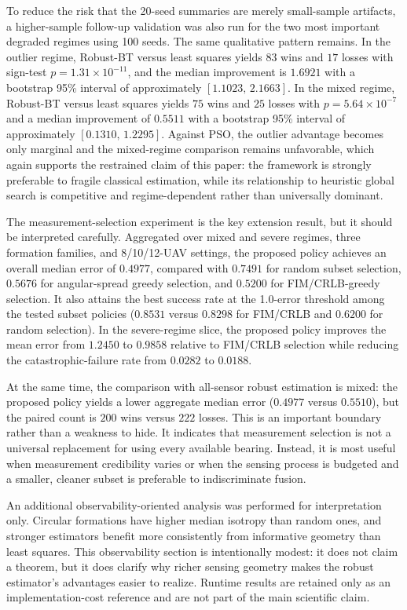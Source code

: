 \documentclass[preprint,12pt]{elsarticle}
\begin{document}
To reduce the risk that the 20-seed summaries are merely small-sample artifacts, a higher-sample follow-up validation was also run for the two most important degraded regimes using 100 seeds. The same qualitative pattern remains. In the outlier regime, Robust-BT versus least squares yields $83$ wins and $17$ losses with sign-test $p=1.31\times10^{-11}$, and the median improvement is $1.6921$ with a bootstrap 95\% interval of approximately $[1.1023,\,2.1663]$. In the mixed regime, Robust-BT versus least squares yields $75$ wins and $25$ losses with $p=5.64\times10^{-7}$ and a median improvement of $0.5511$ with a bootstrap 95\% interval of approximately $[0.1310,\,1.2295]$. Against PSO, the outlier advantage becomes only marginal and the mixed-regime comparison remains unfavorable, which again supports the restrained claim of this paper: the framework is strongly preferable to fragile classical estimation, while its relationship to heuristic global search is competitive and regime-dependent rather than universally dominant.

The measurement-selection experiment is the key extension result, but it should be interpreted carefully. Aggregated over mixed and severe regimes, three formation families, and 8/10/12-UAV settings, the proposed policy achieves an overall median error of $0.4977$, compared with $0.7491$ for random subset selection, $0.5676$ for angular-spread greedy selection, and $0.5200$ for FIM/CRLB-greedy selection. It also attains the best success rate at the 1.0-error threshold among the tested subset policies ($0.8531$ versus $0.8298$ for FIM/CRLB and $0.6200$ for random selection). In the severe-regime slice, the proposed policy improves the mean error from $1.2450$ to $0.9858$ relative to FIM/CRLB selection while reducing the catastrophic-failure rate from $0.0282$ to $0.0188$.

At the same time, the comparison with all-sensor robust estimation is mixed: the proposed policy yields a lower aggregate median error ($0.4977$ versus $0.5510$), but the paired count is $200$ wins versus $222$ losses. This is an important boundary rather than a weakness to hide. It indicates that measurement selection is not a universal replacement for using every available bearing. Instead, it is most useful when measurement credibility varies or when the sensing process is budgeted and a smaller, cleaner subset is preferable to indiscriminate fusion.

An additional observability-oriented analysis was performed for interpretation only. Circular formations have higher median isotropy than random ones, and stronger estimators benefit more consistently from informative geometry than least squares. This observability section is intentionally modest: it does not claim a theorem, but it does clarify why richer sensing geometry makes the robust estimator's advantages easier to realize. Runtime results are retained only as an implementation-cost reference and are not part of the main scientific claim.
\end{document}
